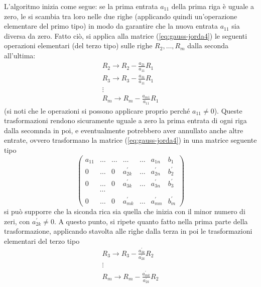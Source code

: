 \documentclass{book}
\theoremstyle{definition}
\theoremstyle{plain}
\begin{document}
L'algoritmo inizia come segue: se la prima entrata $a_{11}$ della prima
riga è uguale a zero, le si scambia tra loro nelle due righe (applicando
quindi un'operazione elementare del primo tipo) in modo da garantire che
la nuova entrata $a_{11}$ sia diversa da zero. Fatto ciò, si applica alla
matrice (\ref{eq:gauss-jorda4}) le seguenti operazioni elementari (del
terzo tipo) sulle righe $R_2,\dots,R_m$ dalla seconda all'ultima:
\begin{equation*}
  \begin{matrix}
    R_2\to R_2-\frac{a_{21}}{a_{11}}R_1\\
    R_{3}\to R_3-\frac{a_{31}}{a_{11}}R_1\\
    \vdots\\
    R_{m}\to R_m-\frac{a_{m1}}{a_{11}}R_1
  \end{matrix}
\end{equation*}
(si noti che le operazioni si possono applicare proprio perché
$a_{11}\neq 0$). Queste trasformazioni rendono sicuramente uguale a zero
la prima entrata di ogni riga dalla secomnda in poi, e eventualmente
potrebbero aver annullato anche altre entrate, ovvero trasformano la
matrice (\ref{eq:gauss-jorda4}) in una matrice seguente tipo
\begin{equation}
  \label{eq:gauss-jorda5}
  \begin{pmatrix}
    a_{11} & \dots & \dots & \dots & \dots & a_{1n} & b_1\\
    0 & \dots & 0 & a_{2k}^\prime & \dots & a_{2n}^\prime & b_2^\prime\\
    0 & \dots & 0 & a_{3k}^\prime & \dots & a_{3n}^\prime & b_3^\prime\\
           & \cdots\\
    0 & \dots & 0 & a_{mk}^\prime & \dots & a_{mn}^\prime & b_m^\prime
  \end{pmatrix}
\end{equation}
si può supporre che la siconda rica sia quella che inizia con il minor
numero di zeri, con $a_{2k}^\prime\neq 0$. A questo punto, si ripete quanto
fatto nella prima parte della trasformazione, applicando stavolta alle
righe dalla terza in poi le trasformazioni elementari del terzo tipo
\begin{equation*}
  \begin{matrix}
    R_3\to R_3-\frac{a^\prime_{3k}}{a_{2k}^\prime}R_2\\
    \vdots\\
    R_m\to R_m-\frac{a^\prime_{mk}}{a_{2k}^\prime}R_2\\
  \end{matrix}
\end{equation*}
\end{document}
